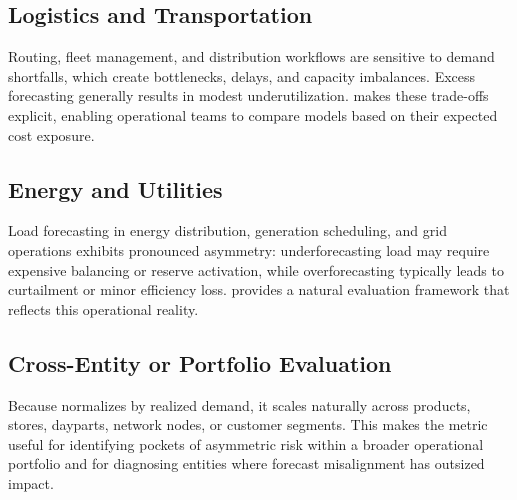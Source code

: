 \subsection{Logistics and Transportation}

Routing, fleet management, and distribution workflows are sensitive to demand
shortfalls, which create bottlenecks, delays, and capacity imbalances. Excess
forecasting generally results in modest underutilization. \CWSL{} makes these
trade-offs explicit, enabling operational teams to compare models based on their
expected cost exposure.

\subsection{Energy and Utilities}

Load forecasting in energy distribution, generation scheduling, and grid
operations exhibits pronounced asymmetry: underforecasting load may require
expensive balancing or reserve activation, while overforecasting typically leads
to curtailment or minor efficiency loss. \CWSL{} provides a natural evaluation
framework that reflects this operational reality.

\subsection{Cross-Entity or Portfolio Evaluation}

Because \CWSL{} normalizes by realized demand, it scales naturally across
products, stores, dayparts, network nodes, or customer segments. This makes the
metric useful for identifying pockets of asymmetric risk within a broader
operational portfolio and for diagnosing entities where forecast misalignment
has outsized impact.
